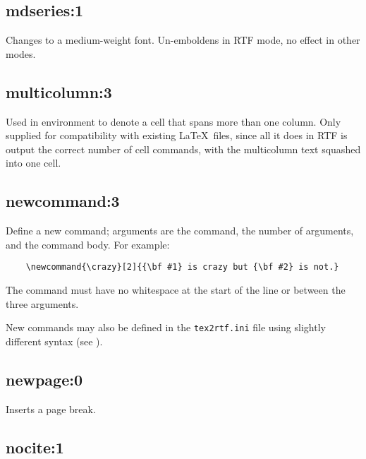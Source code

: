 \subsection*{mdseries:1}\label{mdseries}

Changes to a medium-weight font. Un-emboldens in RTF mode, no effect in other modes.

\subsection*{multicolumn:3}\label{multicolumn}

Used in  environment to denote a cell that
spans more than one column. Only supplied for compatibility with
existing \LaTeX\ files, since all it does in RTF is output the correct
number of cell commands, with the multicolumn text squashed into one cell.

\subsection*{newcommand:3}\label{newcommand}

Define a new command; arguments are the command, the number of
arguments, and the command body. For example:

\begin{verbatim}
    \newcommand{\crazy}[2]{{\bf #1} is crazy but {\bf #2} is not.}
\end{verbatim}

The command must have no whitespace at the start of the line or between
the three arguments.

New commands may also be defined in the {\tt tex2rtf.ini} file using
slightly different syntax (see ).

\subsection*{newpage:0}\label{newpage}

Inserts a page break.

\subsection*{nocite:1}\label{nocite}

